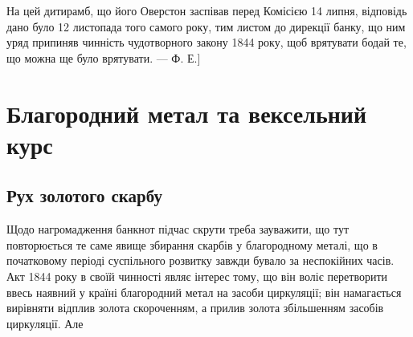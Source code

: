 На цей дитирамб, що його Оверстон заспівав перед Комісією 14 липня,
відповідь дано було 12 листопада того самого року, тим листом до дирекції
банку, що ним уряд припиняв чинність чудотворного закону 1844 року, щоб
врятувати бодай те, що можна ще було врятувати. — Ф. Е.]

\section{Благородний метал та вексельний курс}

\subsection{Рух золотого скарбу}

Щодо нагромадження банкнот підчас скрути треба зауважити, що тут повторюється
те саме явище збирання скарбів у благородному металі, що в початковому
періоді суспільного розвитку завжди бувало за неспокійних часів. Акт
1844 року в своїй чинності являє інтерес тому, що він воліє перетворити ввесь
наявний у країні благородний метал на засоби циркуляції; він намагається вирівняти
відплив золота скороченням, а прилив золота збільшенням засобів циркуляції. Але
\parbreak{}  %
